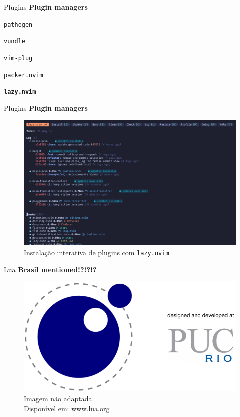 \begin{frame}{Plugins}
  \textbf{Plugin managers}
    \begin{widedescription}
      \item \texttt{pathogen}
      \item \texttt{vundle}
      \item \texttt{vim-plug}
      \item \texttt{packer.nvim}
      \item \textbf{\texttt{lazy.nvim}}
    \end{widedescription}
\end{frame}

\begin{frame}{Plugins}
  \textbf{Plugin managers}
  \begin{figure}
      \centering
      \includegraphics[height=0.5\linewidth]{Image/LazyVim.png}
      \label{lazy-vim}
      \footnotesize
      \\ Instalação interativa de plugins com \texttt{lazy.nvim} \\
  \end{figure}
\end{frame}

\begin{frame}{Lua}
  \textbf{Brasil mentioned!?!?!?}
  \begin{figure}
      \centering
      \includegraphics[height=0.4\linewidth]{Image/Lua-Logo.png}
      \label{lua-logo}
      \footnotesize
      \\ Imagem não adaptada. \\
      Disponível em:  \hyperlink{https://www.lua.org/}{www.lua.org}
  \end{figure}
\end{frame}

